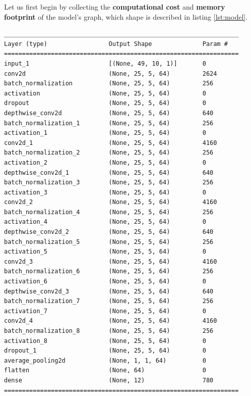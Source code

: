 \documentclass{article}
\begin{document}
Let us first begin by collecting the \textbf{computational cost} and \textbf{memory footprint} of the model's graph, which shape is described in listing \ref{lst:model}.
\begin{lstlisting}
_________________________________________________________________
Layer (type)                 Output Shape              Param #   
=================================================================
input_1                      [(None, 49, 10, 1)]       0         
conv2d                       (None, 25, 5, 64)         2624      
batch_normalization          (None, 25, 5, 64)         256       
activation                   (None, 25, 5, 64)         0         
dropout                      (None, 25, 5, 64)         0         
depthwise_conv2d             (None, 25, 5, 64)         640       
batch_normalization_1        (None, 25, 5, 64)         256       
activation_1                 (None, 25, 5, 64)         0         
conv2d_1                     (None, 25, 5, 64)         4160      
batch_normalization_2        (None, 25, 5, 64)         256       
activation_2                 (None, 25, 5, 64)         0         
depthwise_conv2d_1           (None, 25, 5, 64)         640       
batch_normalization_3        (None, 25, 5, 64)         256       
activation_3                 (None, 25, 5, 64)         0         
conv2d_2                     (None, 25, 5, 64)         4160      
batch_normalization_4        (None, 25, 5, 64)         256       
activation_4                 (None, 25, 5, 64)         0         
depthwise_conv2d_2           (None, 25, 5, 64)         640       
batch_normalization_5        (None, 25, 5, 64)         256       
activation_5                 (None, 25, 5, 64)         0         
conv2d_3                     (None, 25, 5, 64)         4160      
batch_normalization_6        (None, 25, 5, 64)         256       
activation_6                 (None, 25, 5, 64)         0         
depthwise_conv2d_3           (None, 25, 5, 64)         640       
batch_normalization_7        (None, 25, 5, 64)         256       
activation_7                 (None, 25, 5, 64)         0         
conv2d_4                     (None, 25, 5, 64)         4160      
batch_normalization_8        (None, 25, 5, 64)         256       
activation_8                 (None, 25, 5, 64)         0         
dropout_1                    (None, 25, 5, 64)         0         
average_pooling2d            (None, 1, 1, 64)          0         
flatten                      (None, 64)                0         
dense                        (None, 12)                780       
=================================================================
\end{lstlisting}\label{lst:model}
\end{document}
